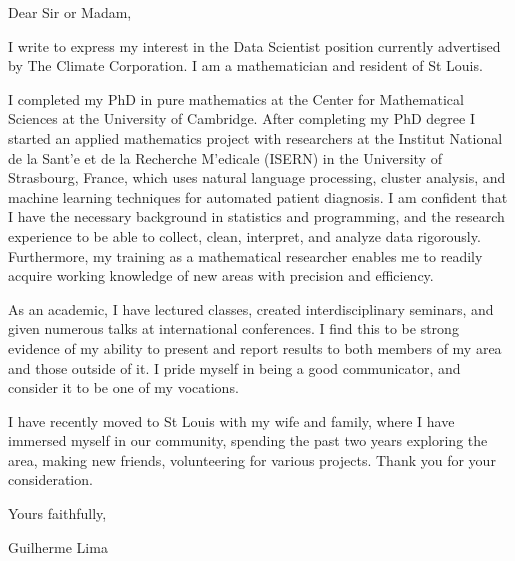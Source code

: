 \documentclass[a4paper,12pt]{letter}
\begin{document}
\begin{letter}{}
\opening{Dear Sir or Madam,}
I write to express my interest in the Data Scientist position currently advertised by The Climate Corporation. I am a mathematician and resident of St Louis. 

I completed my PhD in pure mathematics at the Center for Mathematical Sciences at the University of Cambridge. After completing my PhD degree I started an applied mathematics project with researchers at the Institut National de la Sant\a'e et de la Recherche M\a'edicale (ISERN) in the University of Strasbourg, France, which uses natural language processing, cluster analysis, and machine learning techniques for automated patient diagnosis. I am confident that I have the necessary background in statistics and programming, and the research experience to be able to collect, clean, interpret, and analyze data rigorously. Furthermore, my training as a mathematical researcher enables me to readily acquire working knowledge of new areas with precision and efficiency.

As an academic, I have lectured classes, created interdisciplinary seminars, and given numerous talks at international conferences. I find this to be strong evidence of my ability to present and report results to both members of my area and those outside of it. I pride myself in being a good communicator, and consider it to be one of my vocations.

 I have recently moved to St Louis with my wife and family, where I have immersed myself in our community, spending the past two years exploring the area, making new friends, volunteering for various projects. Thank you for your consideration.

Yours faithfully,

Guilherme Lima 
\end{letter}
\end{document}
